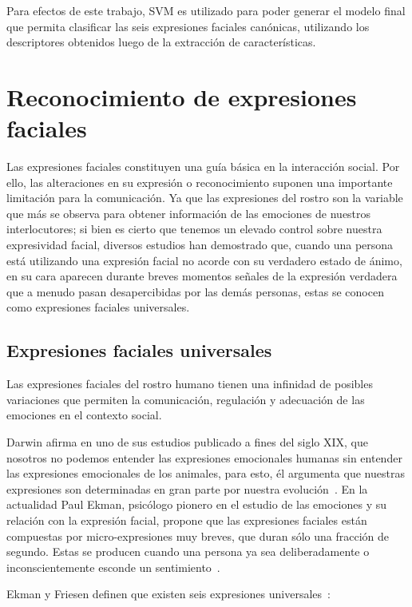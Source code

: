 Para efectos de este trabajo, SVM es utilizado para poder generar el modelo final que permita clasificar las seis expresiones faciales canónicas, utilizando los descriptores obtenidos luego de la extracción de características.

\section{Reconocimiento de expresiones faciales}
\label{sec:fer}
Las expresiones faciales constituyen una guía básica en la interacción social. Por ello, las alteraciones en su expresión o reconocimiento suponen una importante limitación para la comunicación. Ya que las expresiones del rostro son la variable que más se observa para obtener información de las emociones de nuestros interlocutores; si bien es cierto que tenemos un elevado control sobre nuestra expresividad facial, diversos estudios han demostrado que, cuando una persona está utilizando una expresión facial no acorde con su verdadero estado de ánimo, en su cara aparecen durante breves momentos señales de la expresión verdadera que a menudo pasan desapercibidas por las demás personas, estas se conocen como expresiones faciales universales.


\subsection{Expresiones faciales universales}
\label{sec:type_fe}

Las expresiones faciales del rostro humano tienen una infinidad de posibles variaciones que permiten la comunicación, regulación y adecuación de las emociones en el contexto social.

Darwin afirma en uno de  sus estudios publicado a fines del siglo XIX, que nosotros no podemos entender las expresiones emocionales humanas sin entender las expresiones emocionales de los animales, para esto, él argumenta que nuestras expresiones son determinadas en gran parte por nuestra evolución~\cite{Darwin1956,Darwin1998}. En la actualidad Paul Ekman, psicólogo pionero en el estudio de las emociones y su relación con la expresión facial, propone que las expresiones faciales están compuestas por micro-expresiones muy breves, que duran sólo una fracción de segundo. Estas se producen cuando una persona ya sea deliberadamente o inconscientemente esconde un sentimiento~\cite{Ekman1978}.

Ekman y Friesen definen que existen seis expresiones universales~\cite{Ekman2003}: 

